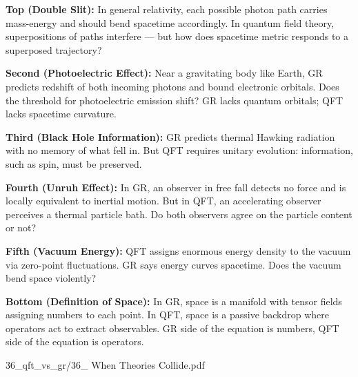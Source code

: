 \begin{SideNotePage}{

    \textbf{Top (Double Slit):}  
    In general relativity, each possible photon path carries mass-energy and should bend spacetime accordingly. In quantum field theory, superpositions of paths interfere — but how does spacetime metric responds to a superposed trajectory? \par
  
    \textbf{Second (Photoelectric Effect):}  
    Near a gravitating body like Earth, GR predicts redshift of both incoming photons and bound electronic orbitals. Does the threshold for photoelectric emission shift? GR lacks quantum orbitals; QFT lacks spacetime curvature. \par
  
    \textbf{Third (Black Hole Information):}  
    GR predicts thermal Hawking radiation with no memory of what fell in. But QFT requires unitary evolution: information, such as spin, must be preserved. \par
  
    \textbf{Fourth (Unruh Effect):}  
    In GR, an observer in free fall detects no force and is locally equivalent to inertial motion. But in QFT, an accelerating observer perceives a thermal particle bath. Do both observers agree on the particle content or not? \par
  
    \textbf{Fifth (Vacuum Energy):}  
    QFT assigns enormous energy density to the vacuum via zero-point fluctuations. GR says energy curves spacetime. Does the vacuum bend space violently? \par
  
    \textbf{Bottom (Definition of Space):}  
    In GR, space is a manifold with tensor fields assigning numbers to each point. In QFT, space is a passive backdrop where operators act to extract observables. GR side of the equation is numbers, QFT side of the equation is operators. \par
}{36_qft_vs_gr/36_ When Theories Collide.pdf}
\end{SideNotePage}
